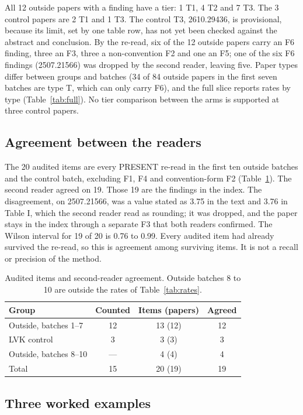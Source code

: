 \documentclass[reprint,amsmath,amssymb,aps,superscriptaddress,nofootinbib]{revtex4-2}
\begin{document}
All 12 outside papers with a finding have a tier: 1 T1, 4 T2 and 7 T3. The 3 control papers are 2 T1 and 1 T3. The control T3, 2610.29436, is provisional, because its limit, set by one table row, has not yet been checked against the abstract and conclusion. By the re-read, six of the 12 outside papers carry an F6 finding, three an F3, three a non-convention F2 and one an F5; one of the six F6 findings (2507.21566) was dropped by the second reader, leaving five. Paper types differ between groups and batches (34 of 84 outside papers in the first seven batches are type T, which can only carry F6), and the full slice reports rates by type (Table~\ref{tab:full}). No tier comparison between the arms is supported at three control papers.

\subsection{Agreement between the readers}

The 20 audited items are every PRESENT re-read in the first ten outside batches and the control batch, excluding F1, F4 and convention-form F2 (Table~\ref{tab:agree}). The second reader agreed on 19. Those 19 are the findings in the index. The disagreement, on 2507.21566, was a value stated as 3.75 in the text and 3.76 in Table I, which the second reader read as rounding; it was dropped, and the paper stays in the index through a separate F3 that both readers confirmed. The Wilson interval for 19 of 20 is 0.76 to 0.99. Every audited item had already survived the re-read, so this is agreement among surviving items. It is not a recall or precision of the method.

\begin{table}[t]
\caption{Audited items and second-reader agreement. Outside batches 8 to 10 are outside the rates of Table~\ref{tab:rates}.}
\label{tab:agree}
\centering\small
\begin{tabular}{lccc}
\hline\hline
Group & Counted & Items (papers) & Agreed \\ \hline
Outside, batches 1--7 & 12 & 13 (12) & 12 \\
LVK control & 3 & 3 (3) & 3 \\
Outside, batches 8--10 & --- & 4 (4) & 4 \\
Total & 15 & 20 (19) & 19 \\
\hline\hline
\end{tabular}
\end{table}

\subsection{Three worked examples}
\label{sec:examples}
\end{document}
